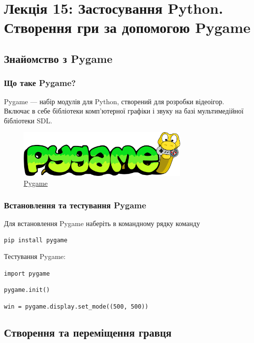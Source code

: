 \section*{Лекція 15: Застосування Python. Створення гри за допомогою Pygame}

\subsection{Знайомство з Pygame} 

\begin{frame}
\frametitle{Що таке Pygame?}
Pygame — набір модулів для Python, створений для розробки відеоігор. Включає в себе бібліотеки комп'ютерної графіки і звуку на базі мультимедійної бібліотеки SDL. 

\begin{figure}
  \begin{center}
    \includegraphics[width=0.75\textwidth,height=0.4\textheight]{pictures/pygame.png}
  \caption{\href{https://www.pygame.org/news}{Pygame}}
\label{function}
  \end{center}
\end{figure}

\end{frame}

\begin{frame}
\frametitle{Встановлення та тестування Pygame}
Для встановлення Pygame наберіть в командному рядку команду

\begin{center}
\texttt{pip install pygame }
\end{center}

\vspace{0.5cm}
Тестування Pygame:

\texttt{import pygame}

\texttt{pygame.init()}

\texttt{win = pygame.display.set\_mode((500, 500))}
\end{frame}

\subsection{Створення та переміщення гравця} 


